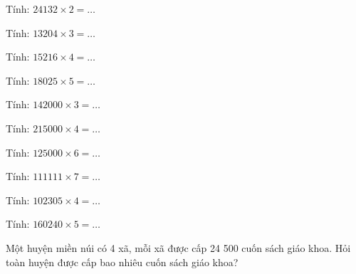 \begin{ex}
Tính: $24132 \times 2 = \dots$
\end{ex}

\begin{ex}
Tính: $13204 \times 3 = \dots$
\end{ex}

\begin{ex}
Tính: $15216 \times 4 = \dots$
\end{ex}

\begin{ex}
Tính: $18025 \times 5 = \dots$
\end{ex}

\begin{ex}
Tính: $142000 \times 3 = \dots$
\end{ex}

\begin{ex}
Tính: $215000 \times 4 = \dots$
\end{ex}

\begin{ex}
Tính: $125000 \times 6 = \dots$
\end{ex}

\begin{ex}
Tính: $111111 \times 7 = \dots$
\end{ex}

\begin{ex}
Tính: $102305 \times 4 = \dots$
\end{ex}

\begin{ex}
Tính: $160240 \times 5 = \dots$
\end{ex}

\begin{ex}
Một huyện miền núi có 4 xã, mỗi xã được cấp 24 500 cuốn sách giáo khoa. Hỏi toàn huyện được cấp bao nhiêu cuốn sách giáo khoa?
\end{ex}

